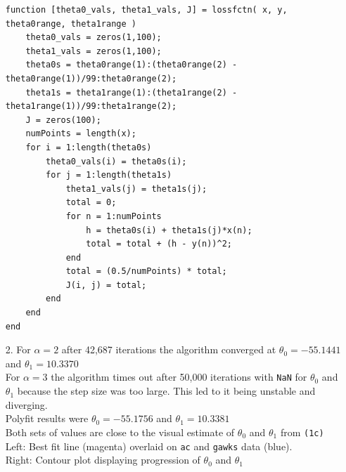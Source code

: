 \documentclass{article}
\begin{document}
\begin{enumerate}
 \bigskip
 
\begin{lstlisting}   
function [theta0_vals, theta1_vals, J] = lossfctn( x, y, theta0range, theta1range )
    theta0_vals = zeros(1,100);
    theta1_vals = zeros(1,100);
    theta0s = theta0range(1):(theta0range(2) - theta0range(1))/99:theta0range(2);
    theta1s = theta1range(1):(theta1range(2) - theta1range(1))/99:theta1range(2);
    J = zeros(100);
    numPoints = length(x);
    for i = 1:length(theta0s)
        theta0_vals(i) = theta0s(i);
        for j = 1:length(theta1s)
            theta1_vals(j) = theta1s(j);
            total = 0;
            for n = 1:numPoints
                h = theta0s(i) + theta1s(j)*x(n);
                total = total + (h - y(n))^2;
            end
            total = (0.5/numPoints) * total;
            J(i, j) = total;
        end
    end
end
\end{lstlisting}

\newpage

\item[2.]
	For $\alpha = 2$ after 42,687 iterations the algorithm converged at $\theta_0 = -55.1441$ and $\theta_1 = 10.3370$\\
	For $\alpha = 3$ the algorithm times out after 50,000 iterations with \texttt{NaN} for $\theta_0$ and  $\theta_1$ because the step size was too large. This led to it being unstable and diverging.\\
	
	Polyfit results were $\theta_0 = -55.1756$ and $\theta_1 = 10.3381$\\
	
	Both sets of values are close to the visual estimate of  $\theta_0$ and  $\theta_1$ from \texttt{(1c)}\\
	
	Left: Best fit line (magenta) overlaid on \texttt{ac} and \texttt{gawks} data (blue).\\
	Right: Contour plot displaying progression of $\theta_0$ and  $\theta_1$\\
	

\end{enumerate}
\end{document}
